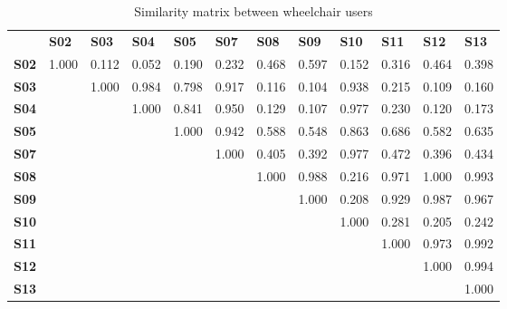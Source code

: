 \begin{table}[h]
\centering
\begin{tabular}{llllllllllll}
\textbf{}    & \textbf{S02} & \textbf{S03} & \textbf{S04} & \textbf{S05} & \textbf{S07} & \textbf{S08} & \textbf{S09} & \textbf{S10} & \textbf{S11} & \textbf{S12} & \textbf{S13} \\
\textbf{S02} & 1.000        & 0.112        & 0.052        & 0.190        & 0.232        & 0.468        & 0.597        & 0.152        & 0.316        & 0.464        & 0.398        \\
\textbf{S03} &              & 1.000        & 0.984        & 0.798        & 0.917        & 0.116        & 0.104        & 0.938        & 0.215        & 0.109        & 0.160        \\
\textbf{S04} &              &              & 1.000        & 0.841        & 0.950        & 0.129        & 0.107        & 0.977        & 0.230        & 0.120        & 0.173        \\
\textbf{S05} &              &              &              & 1.000        & 0.942        & 0.588        & 0.548        & 0.863        & 0.686        & 0.582        & 0.635        \\
\textbf{S07} &              &              &              &              & 1.000        & 0.405        & 0.392        & 0.977        & 0.472        & 0.396        & 0.434        \\
\textbf{S08} &              &              &              &              &              & 1.000        & 0.988        & 0.216        & 0.971        & 1.000        & 0.993        \\
\textbf{S09} &              &              &              &              &              &              & 1.000        & 0.208        & 0.929        & 0.987        & 0.967        \\
\textbf{S10} &              &              &              &              &              &              &              & 1.000        & 0.281        & 0.205        & 0.242        \\
\textbf{S11} &              &              &              &              &              &              &              &              & 1.000        & 0.973        & 0.992        \\
\textbf{S12} &              &              &              &              &              &              &              &              &              & 1.000        & 0.994        \\
\textbf{S13} &              &              &              &              &              &              &              &              &              &              & 1.000       
\end{tabular}
\caption{Similarity matrix between wheelchair users}
\label{distances}
\end{table}


